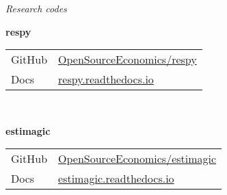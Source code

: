 \begin{frame}\begin{center}
  \Large\textit{Research codes}
\end{center}\end{frame}
\begin{frame}
\textbf{respy}\\\vspace{0.3cm}
\begin{tabular}{ll}
GitHub  & \url{OpenSourceEconomics/respy}\\
Docs    & \url{respy.readthedocs.io}\\
\end{tabular}\\\vspace{1cm}

\textbf{estimagic}\\\vspace{0.3cm}
\begin{tabular}{ll}
GitHub	& \url{OpenSourceEconomics/estimagic}\\
Docs    & \url{estimagic.readthedocs.io}\\
\end{tabular}

\end{frame}
